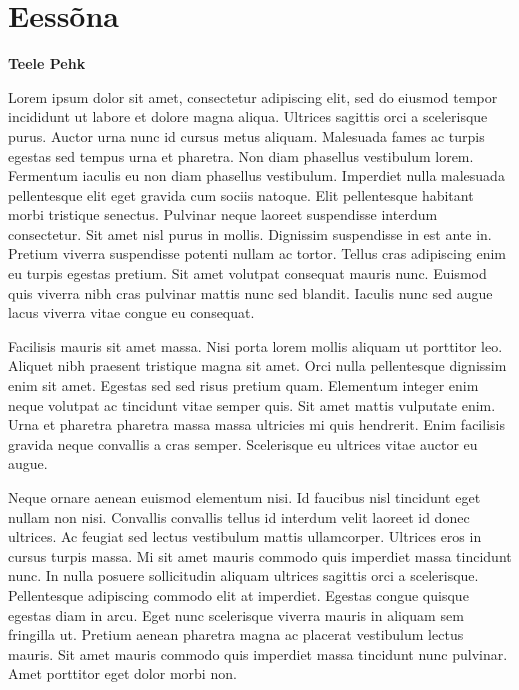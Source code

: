\documentclass[]{book}
\begin{document}
\hypertarget{chapter02}{%
\section*{Eessõna}\label{chapter02}}

\begin{authors}
\textbf{Teele Pehk}
\end{authors}

Lorem ipsum dolor sit amet, consectetur adipiscing elit, sed do eiusmod tempor incididunt ut labore et dolore magna aliqua. Ultrices sagittis orci a scelerisque purus. Auctor urna nunc id cursus metus aliquam. Malesuada fames ac turpis egestas sed tempus urna et pharetra. Non diam phasellus vestibulum lorem. Fermentum iaculis eu non diam phasellus vestibulum. Imperdiet nulla malesuada pellentesque elit eget gravida cum sociis natoque. Elit pellentesque habitant morbi tristique senectus. Pulvinar neque laoreet suspendisse interdum consectetur. Sit amet nisl purus in mollis. Dignissim suspendisse in est ante in. Pretium viverra suspendisse potenti nullam ac tortor. Tellus cras adipiscing enim eu turpis egestas pretium. Sit amet volutpat consequat mauris nunc. Euismod quis viverra nibh cras pulvinar mattis nunc sed blandit. Iaculis nunc sed augue lacus viverra vitae congue eu consequat.

Facilisis mauris sit amet massa. Nisi porta lorem mollis aliquam ut porttitor leo. Aliquet nibh praesent tristique magna sit amet. Orci nulla pellentesque dignissim enim sit amet. Egestas sed sed risus pretium quam. Elementum integer enim neque volutpat ac tincidunt vitae semper quis. Sit amet mattis vulputate enim. Urna et pharetra pharetra massa massa ultricies mi quis hendrerit. Enim facilisis gravida neque convallis a cras semper. Scelerisque eu ultrices vitae auctor eu augue.

Neque ornare aenean euismod elementum nisi. Id faucibus nisl tincidunt eget nullam non nisi. Convallis convallis tellus id interdum velit laoreet id donec ultrices. Ac feugiat sed lectus vestibulum mattis ullamcorper. Ultrices eros in cursus turpis massa. Mi sit amet mauris commodo quis imperdiet massa tincidunt nunc. In nulla posuere sollicitudin aliquam ultrices sagittis orci a scelerisque. Pellentesque adipiscing commodo elit at imperdiet. Egestas congue quisque egestas diam in arcu. Eget nunc scelerisque viverra mauris in aliquam sem fringilla ut. Pretium aenean pharetra magna ac placerat vestibulum lectus mauris. Sit amet mauris commodo quis imperdiet massa tincidunt nunc pulvinar. Amet porttitor eget dolor morbi non.
\end{document}
